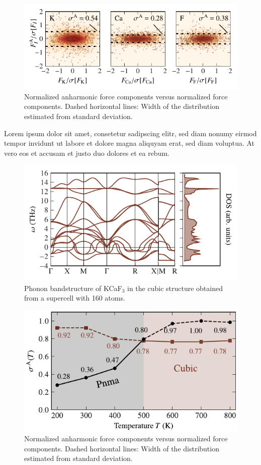 \begin{figure}
	\includegraphics[width=\textwidth]{./data/plots/anharmonicity/5_density_plots/histogram_atoms.pdf}
	\caption{
		Normalized anharmonic force components versus normalized force components. Dashed horizontal lines: Width of the distribution estimated from standard deviation.
	}
\end{figure}
Lorem ipsum dolor sit amet, consetetur sadipscing elitr, sed diam nonumy eirmod tempor invidunt ut labore et dolore magna aliquyam erat, sed diam voluptua. At vero eos et accusam et justo duo dolores et ea rebum.

\begin{figure}
	\includegraphics[width=\textwidth]{./data/plots/anharmonicity/3_bandstructures/KCaF3.cub/bands_dos_emb.pdf}
	\caption{
		Phonon bandstructure of KCaF$_3$ in the cubic structure obtained from a supercell with 160 atoms.
	}
\end{figure}

\begin{figure}
	\includegraphics[width=\textwidth]{./data/plots/anharmonicity/6_phase_transition/sigma_temp_annot.pdf}
	\caption{
		Normalized anharmonic force components versus normalized force components. Dashed horizontal lines: Width of the distribution estimated from standard deviation.
	}
\end{figure}